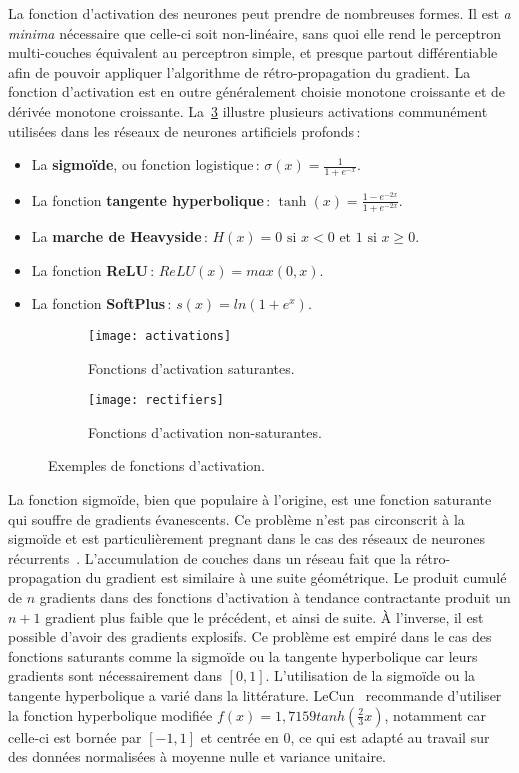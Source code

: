 La fonction d'activation des neurones peut prendre de nombreuses formes. Il est \emph{a minima} nécessaire que celle-ci soit non-linéaire, sans quoi elle rend le perceptron multi-couches équivalent au perceptron simple, et presque partout différentiable afin de pouvoir appliquer l'algorithme de rétro-propagation du gradient. La fonction d'activation est en outre généralement choisie monotone croissante et de dérivée monotone croissante. La~\cref{fig:activations} illustre plusieurs activations communément utilisées dans les réseaux de neurones artificiels profonds\,:
\begin{itemize}
  \item La \textbf{sigmoïde}, ou fonction logistique\,: $\sigma(x) = \frac{1}{1 + e^{-x}}$.
  \item La fonction \textbf{tangente hyperbolique}\,: $\tanh(x) = \frac{1 - e^{-2x}}{1 + e^{-2x}}$.
  \item La \textbf{marche de Heavyside}\,: $H(x) = 0 \text{ si } x < 0 \text{ et } 1 \text{ si } x \geq 0$.
  \item La fonction \textbf{\gls{ReLU}}\,: $ReLU(x) = max(0,x)$.
  \item La fonction \textbf{SoftPlus}\,: $s(x) = ln(1 + e^x)$.
\end{itemize}

\begin{figure}[t]
  \begin{subfigure}[b]{0.5\textwidth}
    \texttt{[image: activations]}
    \caption{Fonctions d'activation saturantes.}
    \label{fig:activations}
  \end{subfigure}
\begin{subfigure}[b]{0.5\textwidth}
  \texttt{[image: rectifiers]}
  \caption{Fonctions d'activation non-saturantes.}
  \label{fig:rectifiers}
\end{subfigure}
\caption{Exemples de fonctions d'activation.}
\label{fig:activations}
\end{figure}

La fonction sigmoïde, bien que populaire à l'origine, est une fonction saturante qui souffre de gradients évanescents. Ce problème n'est pas circonscrit à la sigmoïde et est particulièrement pregnant dans le cas des réseaux de neurones récurrents~\cite{hochreiter_gradient_2001}. L'accumulation de couches dans un réseau fait que la rétro-propagation du gradient est similaire à une suite géométrique. Le produit cumulé de $n$ gradients dans des fonctions d'activation à tendance contractante produit un $n+1$ gradient plus faible que le précédent, et ainsi de suite. À l'inverse, il est possible d'avoir des gradients explosifs. Ce problème est empiré dans le cas des fonctions saturants comme la sigmoïde ou la tangente hyperbolique car leurs gradients sont nécessairement dans $[0,1]$. L'utilisation de la sigmoïde ou la tangente hyperbolique a varié dans la littérature. LeCun~\cite{lecun_efficient_1998} recommande d'utiliser la fonction hyperbolique modifiée $f(x) = 1,7159 tanh(\frac{2}{3} x)$, notamment car celle-ci est bornée par $[-1,1]$ et centrée en 0, ce qui est adapté au travail sur des données normalisées à moyenne nulle et variance unitaire.

